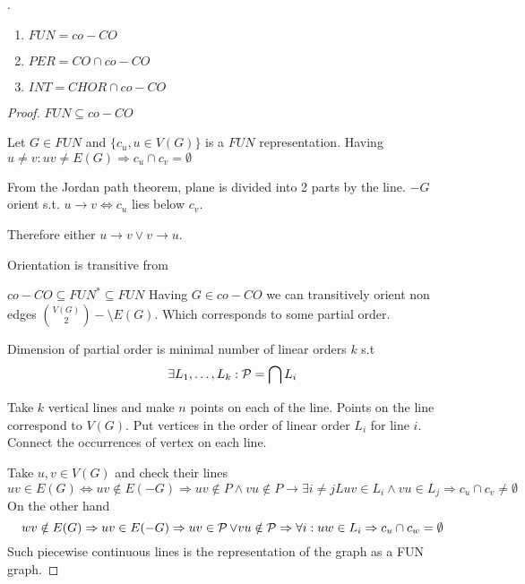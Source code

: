 \begin{theorem}[Complements]
	.
	\begin{enumerate}
		\item $FUN = co-CO$
		\item $PER = CO \cap co-CO$
		\item $INT = CHOR \cap co-CO$
	\end{enumerate}
\end{theorem}
\begin{proof}
	$FUN \subseteq co-CO$

	Let $G \in FUN$ and $\{ c_u, u \in V(G) \}$ is a $FUN$ representation.
	Having $u \ne v: uv \ne E(G) \Rightarrow c_u \cap c_v = \emptyset$

	From the Jordan path theorem, plane is divided into 2 parts by the line.
	$-G$ orient s.t. $u \rightarrow v \iff c_u$ lies below $c_v$.

	Therefore either $u \rightarrow v \lor v \rightarrow u$.

	Orientation is transitive from %

	$co-CO \subseteq FUN^{\ast} \subseteq FUN$
	Having $G \in co-CO$ we can transitively orient non edges $\binom{V(G)}{2} - \setminus E(G)$.
	Which corresponds to some partial order.

	\begin{definition}[PO dimension]
		Dimension of partial order is minimal number of linear orders $k$ s.t
		\[ \exists L_1, \ldots, L_k: \operatorname{\mathcal{P}} = \bigcap L_i \]
	\end{definition}

	Take $k$ vertical lines and make $n$ points on each of the line.
	Points on the line correspond to $V(G)$.
	Put vertices in the order of linear order $L_i$ for line $i$.
	Connect the occurrences of vertex on each line.

	Take $u, v \in V(G)$ and check their lines
	\[ uv \in E(G) \iff uv \notin E(-G) \Rightarrow uv \notin P \land vu \notin P \rightarrow \exists i \ne jL uv \in L_i \land vu \in L_j \Rightarrow c_u \cap c_v \ne \emptyset \]
	On the other hand
	\[ wv \notin E(G) \Rightarrow uv \in E(-G) \Rightarrow uv \in \operatorname{\mathcal{P}} \lor vu \notin \operatorname{\mathcal{P}} \Rightarrow \forall i: uw \in L_i \Rightarrow c_u \cap c_w = \emptyset \]
	Such piecewise continuous lines is the representation of the graph as a FUN graph.
\end{proof}
